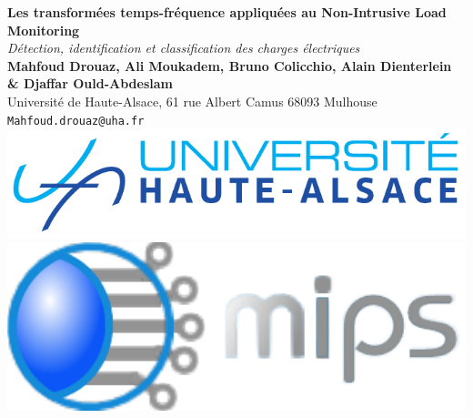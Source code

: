 \documentclass[a0,portrait]{a0poster}
\begin{document}


\begin{minipage}[b]{0.75\linewidth}
\veryHuge \color{NavyBlue} \textbf{Les transformées temps-fréquence appliquées au Non-Intrusive Load Monitoring} \color{Black}\\ %
\Huge\textit{Détection, identification et classification des charges électriques}\\[2cm] %
\huge \textbf{Mahfoud Drouaz, Ali Moukadem, Bruno Colicchio, Alain Dienterlein \& Djaffar Ould-Abdeslam}\\[0.5cm] %
\huge Université de Haute-Alsace, 61 rue Albert Camus 68093 Mulhouse\\[0.4cm] %
\Large \texttt{Mahfoud.drouaz@uha.fr}\\
\includegraphics[width=15cm]{UHA.pdf}\includegraphics[width=15cm]{MIPS.pdf}
\end{minipage}
%
\end{document}
